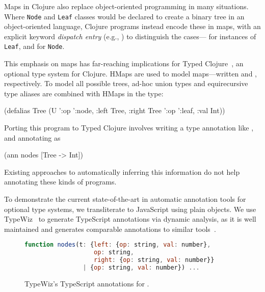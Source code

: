 Maps in Clojure also replace object-oriented programming in many situations.
Where \texttt{Node} and \texttt{Leaf} classes would be declared to create a binary tree
in an object-oriented language, Clojure programs instead encode these in maps,
with an explicit keyword \emph{dispatch entry} (e.g., ) to distinguish the
cases--- for instances of \texttt{Leaf}, and
 for \texttt{Node}.

This emphasis on maps has far-reaching implications for
Typed Clojure~\cite{bonnaire2016practical}, an optional type system for Clojure.
HMaps are used to model maps---written
 and
,
respectively.
To model all possible trees,
ad-hoc union types and
equirecursive type aliases are combined with HMaps
in the type:
\begin{cljlisting}
(defalias Tree
  (U '{:op ':node, :left Tree, :right Tree}
     '{:op ':leaf, :val Int}))
\end{cljlisting}

Porting this program to Typed Clojure involves writing a type annotation
like , and annotating  as
\begin{cljlisting}
(ann nodes [Tree -> Int])
\end{cljlisting}
Existing approaches to automatically inferring this information
do not help annotating these kinds of programs.

To demonstrate the current state-of-the-art in automatic annotation tools for optional type systems,
we transliterate  to JavaScript using plain objects. 
We use TypeWiz~\cite{typewiz} to generate TypeScript annotations via dynamic analysis,
as it is well maintained and generates comparable annotations
to similar tools~\cite{saftoiu2010jstrace,pyannotate,typette18,An10dynamicinference,pytype,kristensen2017inference}.

\begin{figure}
\begin{lstlisting}[language=JavaScript]
function nodes(t: {left: {op: string, val: number},
                   op: string,
                   right: {op: string, val: number}}
                | {op: string, val: number}) ...
\end{lstlisting}
\caption{TypeWiz's TypeScript annotations for .}
\label{fig:infer:typewiz}
\end{figure}

